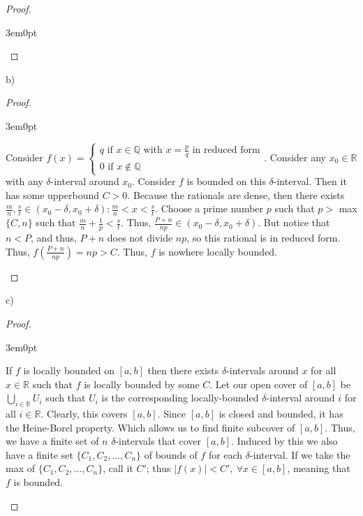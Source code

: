 \documentclass[11pt]{article}
\newcommand{\R}{\mathbb{R}}
\newcommand{\Q}{\mathbb{Q}}
\newenvironment{myproof}
{\begin{proof} \begin{adjustwidth}{3em}{0pt}$ $\par\nobreak\ignorespaces}
{\end{adjustwidth} \end{proof}}
\begin{document}
\begin{flushleft}
\begin{myproof}
\end{myproof}

b)

\begin{myproof}

Consider $f(x) = \begin{cases} q \text{ if $x \in \Q$ with $x = \frac{p}{q}$ in reduced form} \\ 0 \text{ if } x \notin \Q \end{cases}$. Consider any $x_0 \in \R$ with any $\delta$-interval around $x_0$. Consider $f$ is bounded on this $\delta$-interval. Then it has some upperbound $C > 0$. Because the rationals are dense, then there exists $\frac{m}{n}, \frac{s}{t} \in (x_0 - \delta, x_0 + \delta): \frac{m}{n} < x < \frac{s}{t}$. Choose a prime number $p$ such that $p >$ max$\{ C, n \}$ such that $\frac{m}{n} + \frac{1}{p} < \frac{s}{t}$. Thus, $\frac{P + n}{np} \in (x_0 - \delta, x_0 + \delta)$. But notice that $n<P$, and thus, $P+n$ does not divide $np$, so this rational is in reduced form. Thus, $f(\frac{P + n}{np}) = np > C$. Thus, $f$ is nowhere locally bounded.

\end{myproof}

c)

\begin{myproof}

If $f$ is locally bounded on $[a,b]$ then there exists $\delta$-intervals around $x$ for all $x \in \R$ such that $f$ is locally bounded by some $C$. Let our open cover of $[a,b]$ be $\bigcup_{i \in \R} U_i$ such that $U_i$ is the corresponding locally-bounded $\delta$-interval around $i$ for all $i \in \R$. Clearly, this covers $[a,b]$. Since $[a,b]$ is closed and bounded, it has the Heine-Borel property. Which allows us to find finite subcover of $[a,b]$. Thus, we have a finite set of $n$ $\delta$-intervals that cover $[a,b]$. Induced by this we also have a finite set $\{ C_1, C_2, ..., C_n \}$ of bounds of $f$ for each $\delta$-interval. If we take the max of $\{ C_1, C_2, ..., C_n \}$, call it $C'$; thus $|f(x)| < C', \ \forall x \in [a,b]$, meaning that $f$ is bounded.

\end{myproof}

\end{flushleft}
\end{document}
